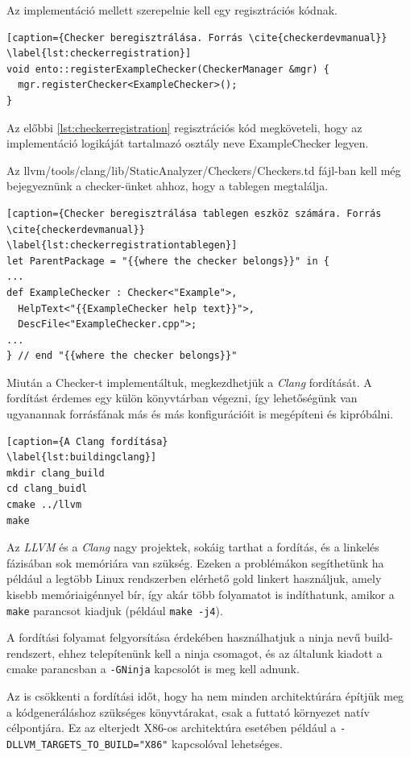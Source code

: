 \documentclass[a4paper,12pt]{report}
\begin{document}
Az implementáció mellett szerepelnie kell egy regisztrációs kódnak.

\begin{lstlisting}[caption={Checker beregisztrálása. Forrás \cite{checkerdevmanual}}
\label{lst:checkerregistration}]
void ento::registerExampleChecker(CheckerManager &mgr) {
  mgr.registerChecker<ExampleChecker>();
}
\end{lstlisting}

Az előbbi \ref{lst:checkerregistration} regisztrációs kód megköveteli, hogy az implementáció logikáját tartalmazó osztály neve ExampleChecker legyen.

Az llvm/tools/clang/lib/StaticAnalyzer/Checkers/Checkers.td fájl-ban kell még bejegyeznünk a checker-ünket ahhoz, hogy a tablegen megtalálja.

\begin{lstlisting}[caption={Checker beregisztrálása tablegen eszköz számára. Forrás \cite{checkerdevmanual}}
\label{lst:checkerregistrationtablegen}]
let ParentPackage = "{{where the checker belongs}}" in {
...
def ExampleChecker : Checker<"Example">,
  HelpText<"{{ExampleChecker help text}}">,
  DescFile<"ExampleChecker.cpp">;
...
} // end "{{where the checker belongs}}"
\end{lstlisting}

Miután a Checker-t implementáltuk, megkezdhetjük a \emph{Clang} fordítását. A fordítást érdemes egy külön könyvtárban végezni, így lehetőségünk van ugyanannak forrásfának más és más konfigurációit is megépíteni és kipróbálni.

\begin{lstlisting}[caption={A Clang fordítása}
\label{lst:buildingclang}]
mkdir clang_build
cd clang_buidl
cmake ../llvm
make
\end{lstlisting}

Az \emph{LLVM} és a \emph{Clang} nagy projektek, sokáig tarthat a fordítás, és a linkelés fázisában sok memóriára van szükség. Ezeken a problémákon segíthetünk ha például a legtöbb Linux rendszerben elérhető gold linkert használjuk, amely kisebb memóriaigénnyel bír, így akár több folyamatot is indíthatunk, amikor a \texttt{make} parancsot kiadjuk (például \texttt{make -j4}).

A fordítási folyamat felgyorsítása érdekében használhatjuk a ninja nevű build-rendszert, ehhez telepítenünk kell a ninja csomagot, és az általunk kiadott a cmake parancsban a \texttt{-GNinja} kapcsolót is meg kell adnunk.

Az is csökkenti a fordítási időt, hogy ha nem minden architektúrára építjük meg a kódgeneráláshoz szükséges könyvtárakat, csak a futtató környezet natív célpontjára. Ez az elterjedt X86-os architektúra esetében például a \texttt{-DLLVM\_TARGETS\_TO\_BUILD="X86"} kapcsolóval lehetséges.
\end{document}
